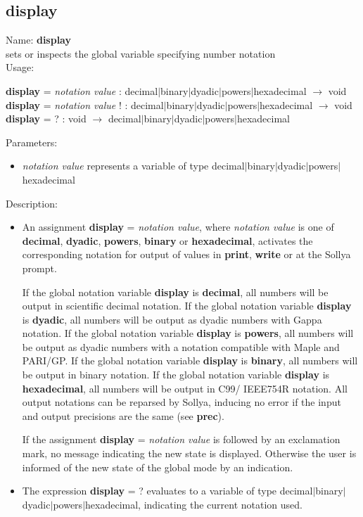 \subsection{display}
\label{labdisplay}
\noindent Name: \textbf{display}\\
sets or inspects the global variable specifying number notation\\

\noindent Usage: 
\begin{center}
\textbf{display} = \emph{notation value} : \textsf{decimal$|$binary$|$dyadic$|$powers$|$hexadecimal} $\rightarrow$ \textsf{void}\\
\textbf{display} = \emph{notation value} ! : \textsf{decimal$|$binary$|$dyadic$|$powers$|$hexadecimal} $\rightarrow$ \textsf{void}\\
\textbf{display} = ? : \textsf{void} $\rightarrow$ \textsf{decimal$|$binary$|$dyadic$|$powers$|$hexadecimal}\\
\end{center}
Parameters: 
\begin{itemize}
\item \emph{notation value} represents a variable of type \textsf{decimal$|$binary$|$dyadic$|$powers$|$hexadecimal}
\end{itemize}
\noindent Description: \begin{itemize}

\item An assignment \textbf{display} = \emph{notation value}, where \emph{notation value} is
   one of \textbf{decimal}, \textbf{dyadic}, \textbf{powers}, \textbf{binary} or \textbf{hexadecimal}, activates
   the corresponding notation for output of values in \textbf{print}, \textbf{write} or
   at the Sollya prompt.
    
   If the global notation variable \textbf{display} is \textbf{decimal}, all numbers will
   be output in scientific decimal notation.  If the global notation
   variable \textbf{display} is \textbf{dyadic}, all numbers will be output as dyadic
   numbers with Gappa notation.  If the global notation variable \textbf{display}
   is \textbf{powers}, all numbers will be output as dyadic numbers with a
   notation compatible with Maple and PARI/GP.  If the global notation
   variable \textbf{display} is \textbf{binary}, all numbers will be output in binary
   notation.  If the global notation variable \textbf{display} is \textbf{hexadecimal},
   all numbers will be output in C99/ IEEE754R notation.  All output
   notations can be reparsed by Sollya, inducing no error if the input
   and output precisions are the same (see \textbf{prec}).
    
   If the assignment \textbf{display} = \emph{notation value} is followed by an
   exclamation mark, no message indicating the new state is
   displayed. Otherwise the user is informed of the new state of the
   global mode by an indication.

\item The expression \textbf{display} = ? evaluates to a variable of type
   \textsf{decimal$|$binary$|$dyadic$|$powers$|$hexadecimal}, indicating the current notation used.
\end{itemize}

